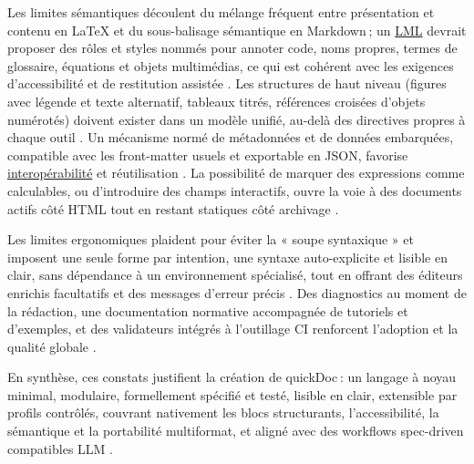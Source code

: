 \documentclass[a4paper,12pt]{article}
\begin{document}
Les limites sémantiques découlent du mélange fréquent entre présentation et contenu en \LaTeX{} et du sous-balisage sémantique en Markdown ; un \protect\hyperlink{gls-2}{\label{gls-2-use-7}LML} devrait proposer des rôles et styles nommés pour annoter code, noms propres, termes de glossaire, équations et objets multimédias, ce qui est cohérent avec les exigences d’accessibilité et de restitution assistée \autocite{jasonc.whiteUsingMarkupLanguages2022,goodgerReStructuredTextMarkupSpecification2025,donathAdmonitionsMaterialMkDocs}. Les structures de haut niveau (figures avec légende et texte alternatif, tableaux titrés, références croisées d’objets numérotés) doivent exister dans un modèle unifié, au-delà des directives propres à chaque outil \autocite{allenAsciiDocWritersGuide,goodgerReStructuredTextMarkupSpecification2025}. Un mécanisme normé de métadonnées et de données embarquées, compatible avec les front-matter usuels et exportable en JSON, favorise \protect\hyperlink{gls-1}{\label{gls-1-use-2}interopérabilité} et réutilisation \autocite{johnmacfarlanePandocUsersGuide2025,massimilianodominiciOverviewPandoc2014}. La possibilité de marquer des expressions comme calculables, ou d’introduire des champs interactifs, ouvre la voie à des documents actifs côté HTML tout en restant statiques côté archivage \autocite{JupyterbookMystmd2025,kaliszykSurveyLanguagesFormalizing2020}.

Les limites ergonomiques plaident pour éviter la « soupe syntaxique » et imposent une seule forme par intention, une syntaxe auto-explicite et lisible en clair, sans dépendance à un environnement spécialisé, tout en offrant des éditeurs enrichis facultatifs et des messages d’erreur précis \autocite{ducasseMicrodownCleanExtensible2020,khareUsingOrgmodeSubversion2012,seoLaTeXNOTEasy2019}. Des diagnostics au moment de la rédaction, une documentation normative accompagnée de tutoriels et d’exemples, et des validateurs intégrés à l’outillage CI renforcent l’adoption et la qualité globale \autocite{johnmacfarlaneCommonMarkSpec2024,EclipseProjectsAsciiDoc2025,johnmacfarlanePandocUsersGuide2025}.

En synthèse, ces constats justifient la création de quickDoc : un langage à noyau minimal, modulaire, formellement spécifié et testé, lisible en clair, extensible par profils contrôlés, couvrant nativement les blocs structurants, l’accessibilité, la sémantique et la portabilité multiformat, et aligné avec des workflows spec-driven compatibles LLM \autocite{GithubSpeckit2025,EclipseProjectsAsciiDoc2025,johnmacfarlaneCommonMarkSpec2024,donathAdmonitionsMaterialMkDocs,jasonc.whiteUsingMarkupLanguages2022}.
\end{document}
